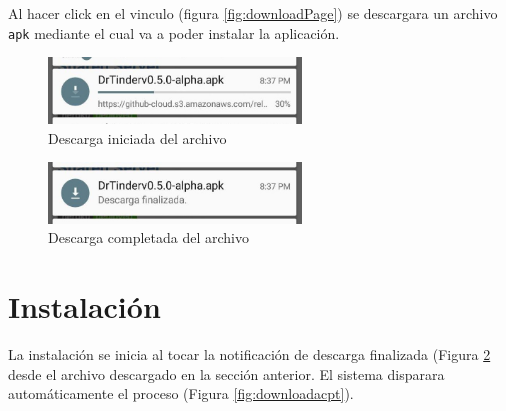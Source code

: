 \documentclass[10pt,letterpaper,extrafontsizes]{memoir}
\begin{document}
Al hacer click en el vinculo (figura \ref{fig:downloadPage}) se descargara un archivo \texttt{apk} mediante el cual va a poder instalar la aplicación.

\begin{figure}[H]
    \centering
\includegraphics[width=0.6\textwidth]{graficos/capturas/d}
    \caption{Descarga iniciada del archivo}
    \label{fig:downloaddiag}
\end{figure}

\begin{figure}[H]
    \centering
\includegraphics[width=0.6\textwidth]{graficos/capturas/e}
    \caption{Descarga completada del archivo}
    \label{fig:downloaddone}
\end{figure}

\section{Instalación}

La instalación se inicia al tocar la notificación de descarga finalizada (Figura \ref{fig:downloaddone} desde el archivo descargado en la sección anterior. El sistema disparara automáticamente el proceso (Figura \ref{fig:downloadacpt}).
\end{document}
